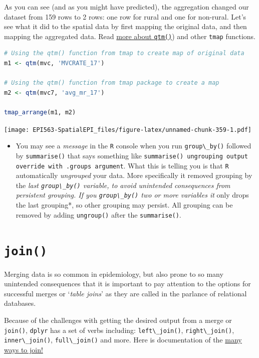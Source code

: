 \documentclass[
]{book}
\newcommand{\passthrough}[1]{#1}
\newenvironment{rmdblock}[1]
  {%
  \begin{itemize}
  \renewcommand{\labelitemi}{
    \raisebox{-.7\height}[0pt][0pt]{
      {\setkeys{Gin}{width=3em,keepaspectratio}\texttt{[image: images/\#1]}}
    }
  }
  \item
  }
  {
  \end{itemize}
  }
\newenvironment{rmdwarning}
  {\begin{rmdblock}{warning}}
  {\end{rmdblock}}
\begin{document}
As you can see (and as you might have predicted), the aggregation changed our dataset from 159 rows to 2 rows: one row for rural and one for non-rural. Let's see what it did to the spatial data by first mapping the original data, and then mapping the aggregated data. Read \protect\hyperlink{qtm}{more about \passthrough{\lstinline!qtm()!}}) and other \passthrough{\lstinline!tmap!} functions.

\begin{lstlisting}[language=R]
# Using the qtm() function from tmap to create map of original data
m1 <- qtm(mvc, 'MVCRATE_17')

# Using the qtm() function from tmap package to create a map
m2 <- qtm(mvc7, 'avg_mr_17')

tmap_arrange(m1, m2)
\end{lstlisting}

\texttt{[image: EPI563-SpatialEPI\_files/figure-latex/unnamed-chunk-359-1.pdf]}

\begin{rmdwarning}
You may see a \emph{message} in the \passthrough{\lstinline!R!} console when you run \passthrough{\lstinline!group\_by()!} followed by \passthrough{\lstinline!summarise()!} that says something like \passthrough{\lstinline!summarise() ungrouping output override with .groups argument!}. What this is telling you is that \passthrough{\lstinline!R!} automatically \emph{ungrouped} your data. More specifically it removed grouping by the \emph{last \passthrough{\lstinline!group\_by()!} variable, to avoid unintended consequences from persistent grouping. If you \passthrough{\lstinline!group\_by()!} two or more variables it }only drops the last grouping*, so other grouping may persist. All grouping can be removed by adding \passthrough{\lstinline!ungroup()!} after the \passthrough{\lstinline!summarise()!}.
\end{rmdwarning}

\hypertarget{join}{%
\section{\texorpdfstring{\texttt{join()}}{join()}}\label{join}}

Merging data is so common in epidemiology, but also prone to so many unintended consequences that it is important to pay attention to the options for successful merges or `\emph{table joins}' as they are called in the parlance of relational databases.

Because of the challenges with getting the desired output from a merge or \passthrough{\lstinline!join()!}, \passthrough{\lstinline!dplyr!} has a set of verbs including: \passthrough{\lstinline!left\_join()!}, \passthrough{\lstinline!right\_join()!}, \passthrough{\lstinline!inner\_join()!}, \passthrough{\lstinline!full\_join()!} and more. Here is documentation of the \href{https://dplyr.tidyverse.org/reference/join.html}{many ways to join!}
\end{document}

